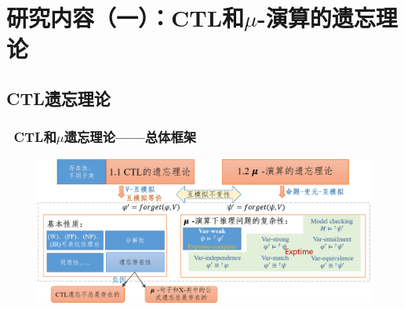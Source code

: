 \documentclass[aspectratio=1610, 9pt, CJK]{beamer}
\begin{document}
\section{研究内容（一）：CTL和$\mu$-演算的遗忘理论}
\subsection{CTL遗忘理论}  
\begin{frame}  
	\frametitle{~CTL和$\mu$遗忘理论——{\footnotesize 总体框架}}
	\begin{figure}
		\includegraphics[scale=0.35]{figures/ctlMuForgFrame}
	\end{figure}
\end{frame}
\end{document}
